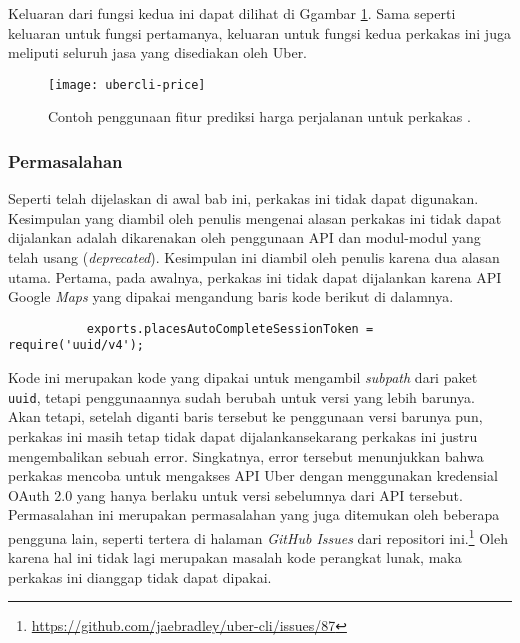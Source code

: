 Keluaran dari fungsi kedua ini dapat dilihat di Ggambar \ref{fig:similarapps-ubercli-price}. Sama seperti keluaran untuk fungsi pertamanya, keluaran untuk fungsi kedua perkakas ini juga meliputi seluruh jasa yang disediakan oleh Uber.
\vspace*{1em} %
\begin{figure}[ht]
    \centering
    \texttt{[image: ubercli-price]}
    \caption[Contoh penggunaan perkakas \ubercli (\textit{price})]{Contoh penggunaan fitur prediksi harga perjalanan untuk perkakas \ubercli\protect\footnotemark.}
    \label{fig:similarapps-ubercli-price}
\end{figure}

\subsubsection{Permasalahan}
\label{sec:similarapps-ubercli-problem}

Seperti telah dijelaskan di awal bab ini, perkakas ini tidak dapat digunakan. Kesimpulan yang diambil oleh penulis mengenai alasan perkakas ini tidak dapat dijalankan adalah dikarenakan oleh penggunaan API dan modul-modul yang telah usang (\textit{deprecated}). Kesimpulan ini diambil oleh penulis karena dua alasan utama. Pertama, pada awalnya, perkakas ini tidak dapat dijalankan karena API Google \textit{Maps} yang dipakai mengandung baris kode berikut di dalamnya.
\vspace{0.5em} %
\begin{verbatim}
           exports.placesAutoCompleteSessionToken = require('uuid/v4');
\end{verbatim}
\newpage %
Kode ini merupakan kode yang dipakai untuk mengambil \textit{subpath} dari paket \verb|uuid|, tetapi penggunaannya sudah berubah untuk versi yang lebih barunya. Akan tetapi, setelah diganti baris tersebut ke penggunaan versi barunya pun, perkakas ini masih tetap tidak dapat dijalankan\textemdash sekarang perkakas ini justru mengembalikan sebuah error. Singkatnya, error tersebut menunjukkan bahwa perkakas mencoba untuk mengakses API Uber dengan menggunakan kredensial OAuth 2.0 yang hanya berlaku untuk versi sebelumnya dari API tersebut. Permasalahan ini merupakan permasalahan yang juga ditemukan oleh beberapa pengguna lain, seperti tertera di halaman \textit{GitHub Issues} dari repositori ini.\footnote{\href{https://github.com/jaebradley/uber-cli/issues/87}{https://github.com/jaebradley/uber-cli/issues/87}} Oleh karena hal ini tidak lagi merupakan masalah kode perangkat lunak, maka perkakas ini dianggap tidak dapat dipakai.

